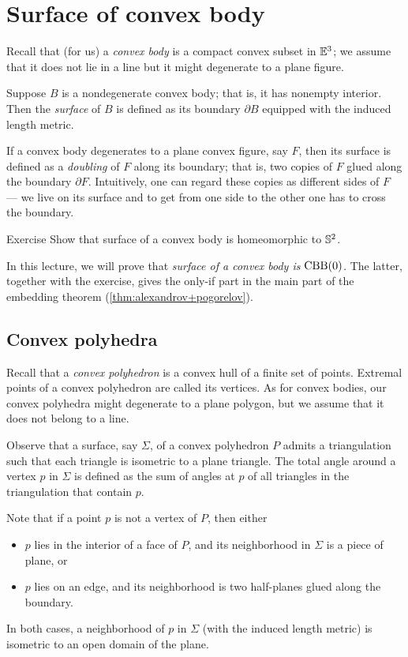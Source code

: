 \chapter{Surface of convex body}

Recall that (for us) a \emph{convex body} is a compact convex subset in $\mathbb{E}^3$;
we assume that it does not lie in a line but it might degenerate to a plane figure.

Suppose $B$ is a nondegenerate convex body; that is, it has nonempty interior.
Then the \emph{surface} of $B$ is defined as its boundary $\partial B$ equipped with the induced length metric.

If a convex body degenerates to a plane convex figure, say $F$, then its surface is defined as a \emph{doubling} of $F$ along its boundary;
that is, two copies of $F$ glued along the boundary $\partial F$.
Intuitively, one can regard these copies as different sides of $F$ --- we live on its surface and to get from one side to the other one has to cross the boundary.

\begin{thm}{Exercise}\label{ex:surf-S2}
Show that surface of a convex body is homeomorphic to $\mathbb{S}^2$.
\end{thm}

In this lecture, we will prove that \textit{surface of a convex body is $\mathrm{CBB}(0)$.}
The latter, together with the exercise, gives the only-if part in the main part of the embedding theorem (\ref{thm:alexandrov+pogorelov}). 



\section{Convex polyhedra}

Recall that a \emph{convex polyhedron} is a convex hull of a finite set of points.
Extremal points of a convex polyhedron are called its vertices.
As for convex bodies, our convex polyhedra might degenerate to a plane polygon, but we assume that it does not belong to a line.

Observe that a surface, say $\Sigma$, of a convex polyhedron $P$ admits a triangulation such that each triangle is isometric to a plane triangle.
The total angle around a vertex $p$ in $\Sigma$ is defined as the sum of angles at $p$ of all triangles in the triangulation that contain $p$.

Note that if a point $p$ is not a vertex of $P$,
then either
\begin{itemize}
\item $p$ lies in the interior of a face of $P$, and its neighborhood in $\Sigma$ is a piece of plane, or
\item $p$ lies on an edge, and its neighborhood is two half-planes glued along the boundary.
\end{itemize}
In both cases, a neighborhood of $p$ in $\Sigma$ (with the induced length metric) is isometric to an open domain of the plane.

